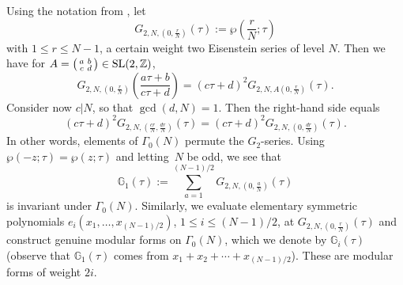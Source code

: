 \documentclass[10pt,a4paper]{amsart}
\numberwithin{equation}{section}
\theoremstyle{definition}
\begin{document}
Using the notation from \cite{Lang}, let
\[
G_{2,N,(0,\frac{r}{N})}(\tau):=\wp \left(\frac{r}{N};\tau \right)
\]
with $1 \leq r \leq N-1$, a certain weight two Eisenstein series of level $N$.
Then we have for $A=\left(\begin{smallmatrix} a & b \\ c & d \end{smallmatrix}\right) \in {\rm SL}(2,\mathbb{Z})$,
\[
G_{2,N,(0,\frac{r}{N})}\left(\frac{a \tau+b}{c \tau +d}\right)=(c\tau+d)^2 G_{2,N,A(0,\frac{r}{N}) }(\tau).
\]
Consider now $c | N$, so that $\gcd(d,N)=1$. Then the right-hand side equals
\[
(c\tau+d)^2 G_{2,N, (\frac{cr}{N}, \frac{dr}{N})}(\tau)= (c\tau+d)^2 G_{2,N, (0, \frac{dr}{N})}(\tau).
\]
In other words, elements of $\Gamma_0(N)$ permute the $G_2$-series. Using $\wp(-z;\tau)=\wp(z;\tau)$ and letting~$N$ be
odd, we see that
\begin{equation*} %
\mathbb{G}_1(\tau):=\sum_{a=1}^{(N-1)/2} G_{2,N, (0, \frac{a}{N})}(\tau)
\end{equation*}
is invariant under $\Gamma_0(N)$. Similarly, we evaluate elementary symmetric polynomials $e_i(x_1,\dots,\allowbreak x_{(N-1)/2})$, $ 1 \leq i \leq (N-1)/2$,
at $G_{2,N,(0,\frac{r}{N})}(\tau)$ and construct genuine modular forms on $\Gamma_0(N)$, which we denote by $\mathbb{G}_i(\tau)$ (observe that
$\mathbb{G}_1(\tau)$ comes from $x_1+x_2+\cdots+x_{(N-1)/2}$).
These are modular forms of weight $2i$.
\end{document}
